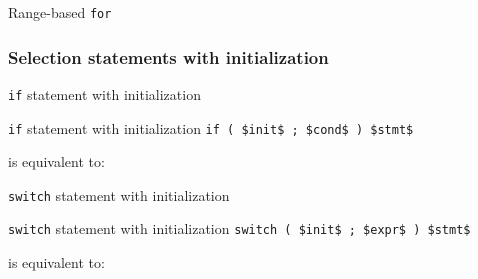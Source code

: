 \begin{frame}{Range-based \texttt{for}}{}
  \begin{example}
  \end{example}
\end{frame}

\subsubsection{Selection statements with initialization}

\begin{frame}{\texttt{if} statement with initialization}{}
  \begin{block}{\texttt{if} statement with initialization}
    {
      \hfill\lstinline[mathescape]!if ( $init$ ; $cond$ ) $stmt$!\hfill
    }

    is equivalent to:

    \smaller
    
  \end{block}

  \begin{example}
  \end{example}
\end{frame}

\begin{frame}{\texttt{switch} statement with initialization}{}
  \begin{block}{\texttt{switch} statement with initialization}
    {
      \hfill\lstinline[mathescape]!switch ( $init$ ; $expr$ ) $stmt$!\hfill
    }

    is equivalent to:

    \smaller
    
  \end{block}

  \begin{example}
  \end{example}
\end{frame}







